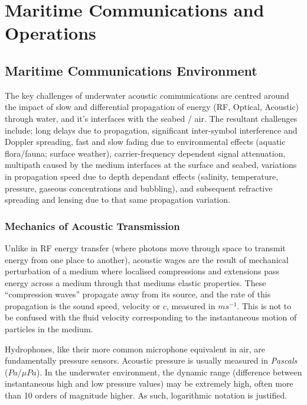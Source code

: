 \chapter{Maritime Communications and Operations}
\label{ch:maritime_background}

\section{Maritime Communications Environment}\label{sec:marine_comms}

The key challenges of underwater acoustic communications are centred around the impact of slow and differential propagation of energy (RF, Optical, Acoustic) through water, and it's interfaces with the seabed / air.
The resultant challenges include; long delays due to propagation, significant inter-symbol interference and Doppler spreading, fast and slow fading due to environmental effects (aquatic flora/fauna; surface weather), carrier-frequency dependent signal attenuation, multipath caused by the medium interfaces at the surface and seabed, variations in propagation speed due to depth dependant effects (salinity, temperature, pressure, gaseous concentrations and bubbling), and subsequent refractive spreading and lensing due to that same propagation variation\cite{Partan2006}.

\subsection{Mechanics of Acoustic Transmission}

Unlike in RF energy transfer (where photons move through space to transmit energy from one place to another), acoustic wages are the result of mechanical perturbation of a medium where localised compressions and extensions pass energy across a medium through that mediums elastic properties.
These ``compression waves'' propagate away from its source, and the rate of this propagation is the sound speed, velocity or $c$, measured in $ms^{-1}$.
This is not to be confused with the fluid velocity corresponding to the instantaneous motion of particles in the medium.

Hydrophones, like their more common microphone equivalent in air, are fundamentally pressure sensors.
Acoustic pressure is usually measured in \emph{Pascals} ($Pa/\mu Pa$). 
In the underwater environment, the dynamic range (difference between instantaneous high and low pressure values) may be extremely high, often more than 10 orders of magnitude higher. 
As such, logarithmic notation is justified.

